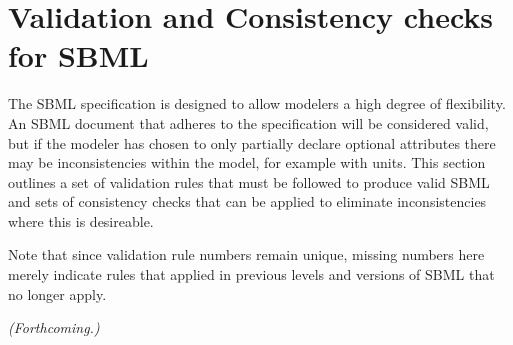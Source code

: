 
\newcommand{\sbmlrule}[1]{\item[#1.]}

\section{Validation and Consistency checks for SBML}
\label{apdx:validation-rules}

The SBML specification is designed to allow modelers a high degree
of flexibility.  An SBML document that adheres to the specification 
will be considered valid, but if the modeler has chosen to only
partially declare optional attributes there may be inconsistencies
within the model, for example with units.  This section outlines a 
set of validation rules that must be followed to produce valid SBML 
and sets of consistency checks that can be applied to eliminate  
inconsistencies where this is desireable.

Note that since validation rule numbers remain unique, missing numbers
here merely indicate rules that applied in previous levels and
versions of SBML that no longer apply.

\emph{(Forthcoming.)}
